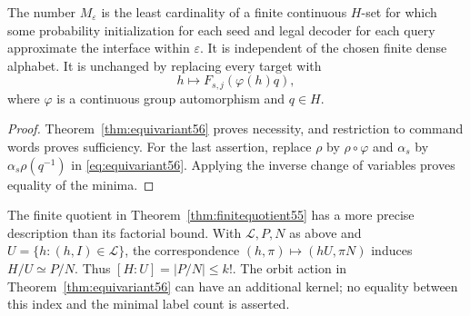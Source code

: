 \begin{corollary}\label{cor:intrinsicminimum56}
The number $M_\varepsilon$ is the least cardinality of a finite continuous $H$-set for which some probability initialization for each seed and legal decoder for each query approximate the interface within $\varepsilon$. It is independent of the chosen finite dense alphabet. It is unchanged by replacing every target with
\[
                       h\longmapsto F_{s,j}(\varphi(h)q),
\]
where $\varphi$ is a continuous group automorphism and $q\in H$.
\end{corollary}
\begin{proof}
Theorem~\ref{thm:equivariant56} proves necessity, and restriction to command words proves sufficiency. For the last assertion, replace $\rho$ by $\rho\circ\varphi$ and $\alpha_s$ by $\alpha_s\rho(q^{-1})$ in \eqref{eq:equivariant56}. Applying the inverse change of variables proves equality of the minima.
\end{proof}
The finite quotient in Theorem~\ref{thm:finitequotient55} has a more precise description than its factorial bound. With $\mathcal L,P,N$ as above and $U=\{h:(h,I)\in\mathcal L\}$, the correspondence $(h,\pi)\mapsto(hU,\pi N)$ induces $H/U\simeq P/N$. Thus $[H:U]=|P/N|\le k!$. The orbit action in Theorem~\ref{thm:equivariant56} can have an additional kernel; no equality between this index and the minimal label count is asserted.

